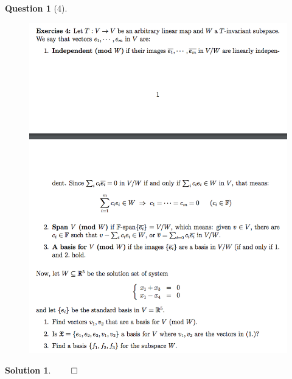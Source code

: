 \documentclass{article} %
\theoremstyle{quest}
\newtheorem*{question}{Question}
\newtheorem*{solution}{Solution}
\begin{document}
\begin{question}[4]
\hfill
\begin{figure}[h!]
  \centering
    \includegraphics[width=1\textwidth]{LA-5-4.png}
\end{figure}
\end{question}
\begin{solution}

\hfill $\qed$ 
\end{solution}

\newpage
\end{document}
